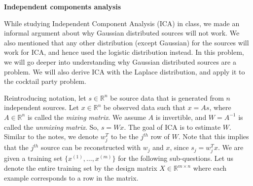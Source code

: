 \clearpage
\item {} {\bf Independent components analysis}


While studying Independent Component Analysis (ICA) in class, we made an informal argument about why Gaussian distributed sources will not work. We also mentioned that any other distribution (except Gaussian) for the sources will work for ICA, and hence used the logistic distribution instead. In this problem, we will go deeper into understanding why Gaussian distributed sources are a problem. We will also derive ICA with the Laplace distribution, and apply it to the cocktail party problem.

Reintroducing notation, let $s \in \mathbb{R}^n$ be source data that is generated from $n$ independent sources. Let $x \in \mathbb{R}^n$ be observed data such that $x = As$, where $A\in\mathbb{R}^n$ is called the \emph{mixing matrix}. We assume $A$ is invertible, and $W = A^{-1}$ is called the \emph{unmixing matrix}. So, $s = Wx$. The goal of ICA is to estimate $W$. Similar to the notes, we denote $w_j^T$ to be the $j^{th}$ row of $W$. Note that this implies that the $j^{th}$ source can be reconstructed with $w_j$ and $x$, since $s_j = w_j^T x$. We are given a training set $\{x^{(1)},\ldots,x^{(m)}\}$ for the following sub-questions. Let us denote the entire training set by the design matrix $X \in \mathbb{R}^{m\times n}$ where each example corresponds to a row in the matrix.

\begin{enumerate}

    
    
    
    
    
    


\end{enumerate}
